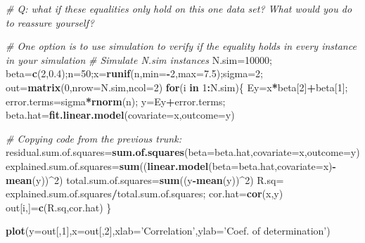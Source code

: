 \documentclass[12pt,]{book}
\newenvironment{Shaded}{\begin{snugshade}}{\end{snugshade}}
\newcommand{\KeywordTok}[1]{\textcolor[rgb]{0.13,0.29,0.53}{\textbf{#1}}}
\newcommand{\DataTypeTok}[1]{\textcolor[rgb]{0.13,0.29,0.53}{#1}}
\newcommand{\DecValTok}[1]{\textcolor[rgb]{0.00,0.00,0.81}{#1}}
\newcommand{\FloatTok}[1]{\textcolor[rgb]{0.00,0.00,0.81}{#1}}
\newcommand{\StringTok}[1]{\textcolor[rgb]{0.31,0.60,0.02}{#1}}
\newcommand{\CommentTok}[1]{\textcolor[rgb]{0.56,0.35,0.01}{\textit{#1}}}
\newcommand{\ControlFlowTok}[1]{\textcolor[rgb]{0.13,0.29,0.53}{\textbf{#1}}}
\newcommand{\OperatorTok}[1]{\textcolor[rgb]{0.81,0.36,0.00}{\textbf{#1}}}
\newcommand{\NormalTok}[1]{#1}
\begin{document}
\begin{Shaded}
\begin{Highlighting}[]
\CommentTok{# Q: what if these equalities only hold on this one data set? What would you do to reassure yourself?}

\CommentTok{# One option is to use simulation to verify if the equality holds in every instance in your simulation }
\CommentTok{# Simulate N.sim instances}
\NormalTok{N.sim=}\DecValTok{10000}\NormalTok{;}
\NormalTok{beta=}\KeywordTok{c}\NormalTok{(}\DecValTok{2}\NormalTok{,}\FloatTok{0.4}\NormalTok{);n=}\DecValTok{50}\NormalTok{;x=}\KeywordTok{runif}\NormalTok{(n,}\DataTypeTok{min=}\OperatorTok{-}\DecValTok{2}\NormalTok{,}\DataTypeTok{max=}\FloatTok{7.5}\NormalTok{);sigma=}\DecValTok{2}\NormalTok{;}
\NormalTok{out=}\KeywordTok{matrix}\NormalTok{(}\DecValTok{0}\NormalTok{,}\DataTypeTok{nrow=}\NormalTok{N.sim,}\DataTypeTok{ncol=}\DecValTok{2}\NormalTok{)}
\ControlFlowTok{for}\NormalTok{(i }\ControlFlowTok{in} \DecValTok{1}\OperatorTok{:}\NormalTok{N.sim)\{}
\NormalTok{  Ey=x}\OperatorTok{*}\NormalTok{beta[}\DecValTok{2}\NormalTok{]}\OperatorTok{+}\NormalTok{beta[}\DecValTok{1}\NormalTok{];}
\NormalTok{  error.terms=sigma}\OperatorTok{*}\KeywordTok{rnorm}\NormalTok{(n);}
\NormalTok{  y=Ey}\OperatorTok{+}\NormalTok{error.terms;}
\NormalTok{  beta.hat=}\KeywordTok{fit.linear.model}\NormalTok{(}\DataTypeTok{covariate=}\NormalTok{x,}\DataTypeTok{outcome=}\NormalTok{y)}

  \CommentTok{# Copying code from the previous trunk:}
\NormalTok{  residual.sum.of.squares=}\KeywordTok{sum.of.squares}\NormalTok{(}\DataTypeTok{beta=}\NormalTok{beta.hat,}\DataTypeTok{covariate=}\NormalTok{x,}\DataTypeTok{outcome=}\NormalTok{y)}
\NormalTok{  explained.sum.of.squares=}\KeywordTok{sum}\NormalTok{((}\KeywordTok{linear.model}\NormalTok{(}\DataTypeTok{beta=}\NormalTok{beta.hat,}\DataTypeTok{covariate=}\NormalTok{x)}\OperatorTok{-}\KeywordTok{mean}\NormalTok{(y))}\OperatorTok{^}\DecValTok{2}\NormalTok{)}
\NormalTok{  total.sum.of.squares=}\KeywordTok{sum}\NormalTok{((y}\OperatorTok{-}\KeywordTok{mean}\NormalTok{(y))}\OperatorTok{^}\DecValTok{2}\NormalTok{)}
\NormalTok{  R.sq=}\StringTok{ }\NormalTok{explained.sum.of.squares}\OperatorTok{/}\NormalTok{total.sum.of.squares;}
\NormalTok{  cor.hat=}\KeywordTok{cor}\NormalTok{(x,y)}
\NormalTok{  out[i,]=}\KeywordTok{c}\NormalTok{(R.sq,cor.hat)}
\NormalTok{\}}

\KeywordTok{plot}\NormalTok{(}\DataTypeTok{y=}\NormalTok{out[,}\DecValTok{1}\NormalTok{],}\DataTypeTok{x=}\NormalTok{out[,}\DecValTok{2}\NormalTok{],}\DataTypeTok{xlab=}\StringTok{'Correlation'}\NormalTok{,}\DataTypeTok{ylab=}\StringTok{'Coef. of determination'}\NormalTok{)}
\end{Highlighting}
\end{Shaded}
\end{document}

